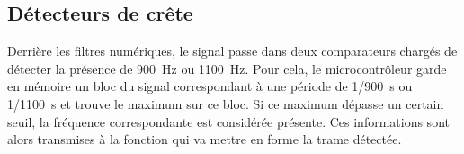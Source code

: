 \subsection{Détecteurs de crête}
Derrière les filtres numériques, le signal passe dans deux comparateurs chargés de détecter la présence de \SI{900}{\hertz} ou \SI{1100}{\hertz}. Pour cela, le microcontrôleur garde en mémoire un bloc du signal correspondant à une période de \SI{1/900}{\second} ou \SI{1/1100}{\second} et trouve le maximum sur ce bloc. Si ce maximum dépasse un certain seuil, la fréquence correspondante est considérée présente. Ces informations sont alors transmises à la fonction  qui va mettre en forme la trame détectée.
